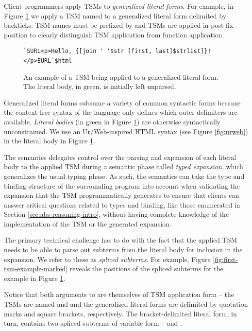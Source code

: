 Client programmers apply TSMs to \emph{generalized literal forms}. For example, in Figure \ref{fig:first-tsm-example} we apply a TSM named  to a generalized literal form delimited by backticks. TSM names must be prefixed by \li{#\dolla#} and TSMs are applied in post-fix position to clearly distinguish TSM application from function application.
\begin{figure}[ht!]
\begin{lstlisting}[numbers=none]
`SURL<p>Hello, {[join ' '$str [first, last]$strlist]}!</p>EURL`$html
\end{lstlisting}
\caption{An example of a TSM being applied to a generalized literal form. The literal body, in green, is initially left unparsed.}
\label{fig:first-tsm-example}
\end{figure}

\newpage
Generalized literal forms subsume a variety of common syntactic forms because the context-free syntax of the language only defines which outer delimiters are available. \emph{Literal bodies} (in green in Figure \ref{fig:first-tsm-example}) are otherwise syntactically unconstrained. We use an Ur/Web-inspired HTML syntax (see Figure \ref{fig:urweb}) in the literal body in Figure \ref{fig:first-tsm-example}.  

The semantics delegates control over the parsing and expansion of each literal body to the applied TSM during a semantic phase called \emph{typed expansion}, which generalizes the usual typing phase. As such, the semantics can take the type and binding structure of the surrounding program into account when validating the expansion that the TSM programmatically generates to ensure that clients can answer critical questions related to types and binding, like those enumerated in Section \ref{sec:abs-reasoning-intro}, without having complete knowledge of the implementation of the TSM or the generated expansion.

The primary technical challenge has to do with the fact that the applied TSM needs to be able to parse out subterms from the literal body for inclusion in the expansion. We refer to these as \emph{spliced subterms}. For example, Figure \ref{fig:first-tsm-example-marked} reveals the positions of the spliced subterms for the example in Figure \ref{fig:first-tsm-example}.

Notice that both arguments to  are themselves of TSM application form -- the TSMs are named  and  and the generalized literal forms are delimited by quotation marks and square brackets, respectively. The bracket-delimited literal form, in turn, contains two spliced subterms of variable form --  and .

